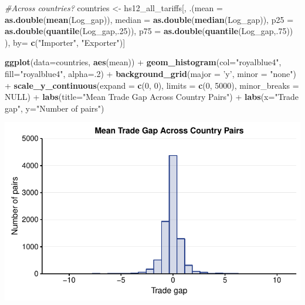 \documentclass[10pt,]{article}
\newenvironment{Shaded}{\begin{snugshade}}{\end{snugshade}}
\newcommand{\KeywordTok}[1]{\textcolor[rgb]{0.13,0.29,0.53}{\textbf{{#1}}}}
\newcommand{\DataTypeTok}[1]{\textcolor[rgb]{0.13,0.29,0.53}{{#1}}}
\newcommand{\DecValTok}[1]{\textcolor[rgb]{0.00,0.00,0.81}{{#1}}}
\newcommand{\StringTok}[1]{\textcolor[rgb]{0.31,0.60,0.02}{{#1}}}
\newcommand{\CommentTok}[1]{\textcolor[rgb]{0.56,0.35,0.01}{\textit{{#1}}}}
\newcommand{\OtherTok}[1]{\textcolor[rgb]{0.56,0.35,0.01}{{#1}}}
\newcommand{\NormalTok}[1]{{#1}}
\begin{document}
\begin{Shaded}
\begin{Highlighting}[]
\CommentTok{#Across countries?}
\NormalTok{countries <-}\StringTok{ }\NormalTok{hs12_all_tariffs[, .(}\DataTypeTok{mean =} \KeywordTok{as.double}\NormalTok{(}\KeywordTok{mean}\NormalTok{(Log_gap)),}
                            \DataTypeTok{median =} \KeywordTok{as.double}\NormalTok{(}\KeywordTok{median}\NormalTok{(Log_gap)),}
                            \DataTypeTok{p25 =} \KeywordTok{as.double}\NormalTok{(}\KeywordTok{quantile}\NormalTok{(Log_gap,.}\DecValTok{25}\NormalTok{)),}
                            \DataTypeTok{p75 =} \KeywordTok{as.double}\NormalTok{(}\KeywordTok{quantile}\NormalTok{(Log_gap,.}\DecValTok{75}\NormalTok{))}
\NormalTok{),}
\NormalTok{by=}\StringTok{ }\KeywordTok{c}\NormalTok{(}\StringTok{"Importer"}\NormalTok{, }\StringTok{"Exporter"}\NormalTok{)]}

\KeywordTok{ggplot}\NormalTok{(}\DataTypeTok{data=}\NormalTok{countries, }\KeywordTok{aes}\NormalTok{(mean)) +}
\StringTok{  }\KeywordTok{geom_histogram}\NormalTok{(}\DataTypeTok{col=}\StringTok{"royalblue4"}\NormalTok{,}
                 \DataTypeTok{fill=}\StringTok{"royalblue4"}\NormalTok{,}
                 \DataTypeTok{alpha=}\NormalTok{.}\DecValTok{2}\NormalTok{) +}
\StringTok{  }\KeywordTok{background_grid}\NormalTok{(}\DataTypeTok{major =} \StringTok{'y'}\NormalTok{, }\DataTypeTok{minor =} \StringTok{"none"}\NormalTok{) +}
\StringTok{  }\KeywordTok{scale_y_continuous}\NormalTok{(}\DataTypeTok{expand =} \KeywordTok{c}\NormalTok{(}\DecValTok{0}\NormalTok{, }\DecValTok{0}\NormalTok{), }\DataTypeTok{limits =} \KeywordTok{c}\NormalTok{(}\DecValTok{0}\NormalTok{, }\DecValTok{5000}\NormalTok{),  }\DataTypeTok{minor_breaks =} \OtherTok{NULL}\NormalTok{) +}
\StringTok{  }\KeywordTok{labs}\NormalTok{(}\DataTypeTok{title=}\StringTok{"Mean Trade Gap Across Country Pairs"}\NormalTok{) +}
\StringTok{  }\KeywordTok{labs}\NormalTok{(}\DataTypeTok{x=}\StringTok{"Trade gap"}\NormalTok{, }\DataTypeTok{y=}\StringTok{"Number of pairs"}\NormalTok{)}
\end{Highlighting}
\end{Shaded}

\begin{center}\includegraphics{Figs/value_summary-6} \end{center}
\end{document}
